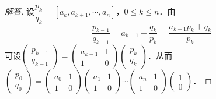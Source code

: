 \documentclass[a4paper,fontset=windows]{ctexbook}
\theoremstyle{definition}
\renewcommand{\le}{\leqslant}
\begin{document}
\begin{proof}[解答]
设$\dfrac{p_k}{q_k}=[a_k,a_{k+1},\cdots,a_n]$，$0\le k\le n$．由
$$\frac{p_{k-1}}{q_{k-1}}=a_{k-1}+\frac{q_k}{p_k}=\frac{a_{k-1}p_k+q_k}{p_k}$$
可设$\begin{pmatrix}p_{k-1} \\ q_{k-1}\end{pmatrix}=\begin{pmatrix}a_{k-1}&1 \\ 1&0\end{pmatrix}\begin{pmatrix}p_k \\ q_k\end{pmatrix}$．从而$\begin{pmatrix}p_0 \\ q_0\end{pmatrix}=\begin{pmatrix}a_0&1 \\ 1&0\end{pmatrix}\begin{pmatrix}a_1&1 \\ 1&0\end{pmatrix}\cdots\begin{pmatrix}a_n&1 \\ 1&0\end{pmatrix}\begin{pmatrix}1 \\ 0\end{pmatrix}$．
\end{proof}
\end{document}
